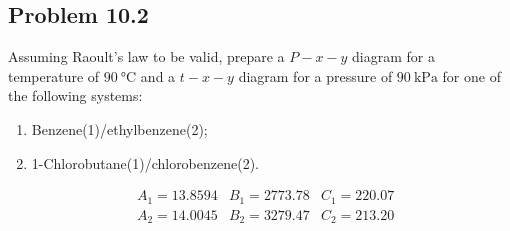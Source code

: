 \documentclass{article}
\begin{document}
\subsection*{Problem 10.2}
Assuming Raoult's law to be valid, prepare a $P-x-y$ diagram for a
temperature of $90~\unit{\degreeCelsius}$ and a $t-x-y$ diagram for a
pressure of $90~\unit{\kilo\pascal}$ for one of the following systems:
\begin{enumerate}[label=(\alph*)]
  \item Benzene(1)/ethylbenzene(2);
  \item 1-Chlorobutane(1)/chlorobenzene(2).
\end{enumerate}
\begin{solution}
  \begin{gather*}
    &A_{1} = 13.8594 &B_{1} = 2773.78 &C_{1} = 220.07 \\
    &A_{2} = 14.0045 &B_{2} = 3279.47 &C_{2} = 213.20
  \end{gather*}
\end{solution}
\end{document}
